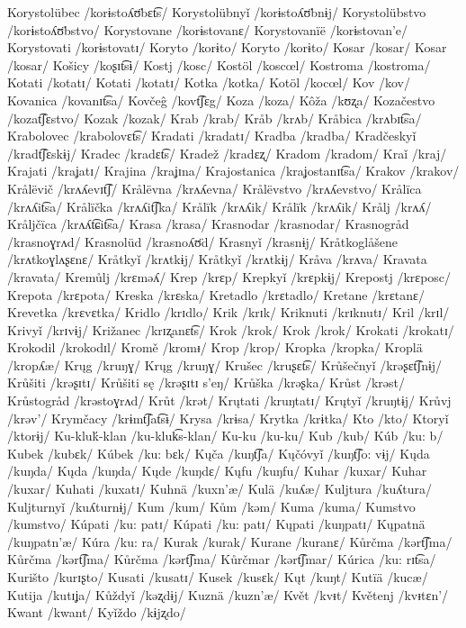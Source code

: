 Korystolübec /korɨstoʎʊ̈bɛt͡s/
Korystolübnyǐ /korɨstoʎʊ̈bnɨj/
Korystolübstvo /korɨstoʎʊ̈bstvo/
Korystovane /korɨstovanɛ/
Korystovanïë /korɨstovan’e/
Korystovati /korɨstovatɪ/
Koryto /korɨto/
Koryto /korɨto/
Kosar /kosar/
Kosar /kosar/
Košicy /koʂɪt͡sɨ/
Kostj /kosc/
Kostöl /koscœl/
Kostroma /kostroma/
Kotati /kotatɪ/
Kotati /kotatɪ/
Kotka /kotka/
Kotöl /kocœl/
Kov /kov/
Kovanica /kovanɪt͡sa/
Kovčeĝ /kovt͡ʃɛg/
Koza /koza/
Kôža /kʊʐa/
Kozačestvo /kozat͡ʃɛstvo/
Kozak /kozak/
Krab /krab/
Kråb /krʌb/
Kråbica /krʌbɪt͡sa/
Krabolovec /krabolovɛt͡s/
Kradati /kradatɪ/
Kradba /kradba/
Kradčeskyǐ /kradt͡ʃɛskɨj/
Kradec /kradɛt͡s/
Kradež /kradɛʐ/
Kradom /kradom/
Kraǐ /kraj/
Krajati /kraʝatɪ/
Krajina /kraʝɪna/
Krajostanica /kraʝostanɪt͡sa/
Krakov /krakov/
Krålëvič /krʌʎevɪt͡ʃ/
Krålëvna /krʌʎevna/
Krålëvstvo /krʌʎevstvo/
Krålïca /krʌʎit͡sa/
Krålïčka /krʌʎit͡ʃka/
Krålïk /krʌʎik/
Krålïk /krʌʎik/
Krålj /krʌʎ/
Kråljčïca /krʌʎt͡ɕit͡sa/
Krasa /krasa/
Krasnodar /krasnodar/
Krasnogråd /krasnoɣrʌd/
Krasnolüd /krasnoʎʊ̈d/
Krasnyǐ /krasnɨj/
Kråtkoglåšene /krʌtkoɣlʌʂɛnɛ/
Kråtkyǐ /krʌtkɨj/
Kråtkyǐ /krʌtkɨj/
Kråva /krʌva/
Kravata /kravata/
Kremůlj /krɛməʎ/
Krep /krɛp/
Krepkyǐ /krɛpkɨj/
Krepostj /krɛposc/
Krepota /krɛpota/
Kreska /krɛska/
Kretadlo /krɛtadlo/
Kretane /krɛtanɛ/
Krevetka /krɛvɛtka/
Kridlo /krɪdlo/
Krik /krɪk/
Kriknuti /krɪknutɪ/
Kril /krɪl/
Krivyǐ /krɪvɨj/
Križanec /krɪʐanɛt͡s/
Krok /krok/
Krok /krok/
Krokati /krokatɪ/
Krokodil /krokodɪl/
Kromě /kromᵻ/
Krop /krop/
Kropka /kropka/
Kroplä /kropʎæ/
Krųg /kruŋɣ/
Krųg /kruŋɣ/
Krušec /kruʂɛt͡s/
Krůšečnyǐ /krəʂɛt͡ʃnɨj/
Krůšiti /krəʂɪtɪ/
Krůšiti sę /krəʂɪtɪ s’eŋ/
Krůška /krəʂka/
Krůst /krəst/
Krůstogråd /krəstoɣrʌd/
Krůt /krət/
Krųtati /kruŋtatɪ/
Krųtyǐ /kruŋtɨj/
Krůvj /krəv’/
Krymčacy /krɨmt͡ʃat͡sɨ/
Krysa /krɨsa/
Krytka /krɨtka/
Kto /kto/
Ktoryǐ /ktorɨj/
Ku-kluḱ-klan /ku-kluk͡s-klan/
Ku-ku /ku-ku/
Kub /kub/
Kúb /ku: b/
Kubek /kubɛk/
Kúbek /ku: bɛk/
Kųča /kuŋt͡ʃa/
Kųčóvyǐ /kuŋt͡ʃo: vɨj/
Kųda /kuŋda/
Kųda /kuŋda/
Kųde /kuŋdɛ/
Kųfu /kuŋfu/
Kuhar /kuxar/
Kuhar /kuxar/
Kuhati /kuxatɪ/
Kuhnä /kuxn’æ/
Kulä /kuʎæ/
Kuljtura /kuʎtura/
Kuljturnyǐ /kuʎturnɨj/
Kum /kum/
Kům /kəm/
Kuma /kuma/
Kumstvo /kumstvo/
Kúpati /ku: patɪ/
Kúpati /ku: patɪ/
Kųpati /kuŋpatɪ/
Kųpatnä /kuŋpatn’æ/
Kúra /ku: ra/
Kurak /kurak/
Kurane /kuranɛ/
Kůrčma /kərt͡ʃma/
Kůrčma /kərt͡ʃma/
Kůrčma /kərt͡ʃma/
Kůrčmar /kərt͡ʃmar/
Kúrica /ku: rɪt͡sa/
Kurišto /kurɪʂto/
Kusati /kusatɪ/
Kusek /kusɛk/
Kųt /kuŋt/
Kutïä /kucæ/
Kutija /kutɪʝa/
Kůždyǐ /kəʐdɨj/
Kuznä /kuzn’æ/
Květ /kvᵻt/
Květenj /kvᵻtɛn’/
Kwant /kwant/
Kyǐždo /kɨjʐdo/